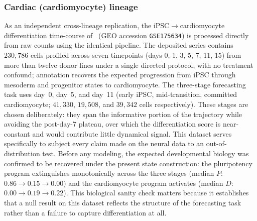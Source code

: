\documentclass[pdflatex,sn-mathphys-num]{sn-jnl}
\theoremstyle{thmstyleone}%
\theoremstyle{thmstyletwo}%
\theoremstyle{thmstylethree}%
\begin{document}
\subsubsection{Cardiac (cardiomyocyte) lineage} As an independent cross-lineage replication, the iPSC$\rightarrow$cardiomyocyte differentiation time-course of~\cite{elorbany2022single} (GEO accession \texttt{GSE175634}) is processed directly from raw counts using the identical pipeline. The deposited series contains $230{,}786$ cells profiled across seven timepoints (days 0, 1, 3, 5, 7, 11, 15) from more than twelve donor lines under a single directed protocol, with no treatment confound; annotation recovers the expected progression from iPSC through mesoderm and progenitor states to cardiomyocyte. The three-stage forecasting task uses day~0, day~5, and day~11 (early iPSC, mid-transition, committed cardiomyocyte; $41{,}330$, $19{,}508$, and $39{,}342$ cells respectively). These stages are chosen deliberately: they span the informative portion of the trajectory while avoiding the post-day-7 plateau, over which the differentiation score is near-constant and would contribute little dynamical signal. This dataset serves specifically to subject every claim made on the neural data to an out-of-distribution test. Before any modeling, the expected developmental biology was confirmed to be recovered under the present state construction: the pluripotency program extinguishes monotonically across the three stages (median $P$: $0.86\!\rightarrow\!0.15\!\rightarrow\!0.00$) and the cardiomyocyte program activates (median $D$: $0.00\!\rightarrow\!0.19\!\rightarrow\!0.22$). This biological sanity check matters because it establishes that a null result on this dataset reflects the structure of the forecasting task rather than a failure to capture differentiation at all.
\end{document}
